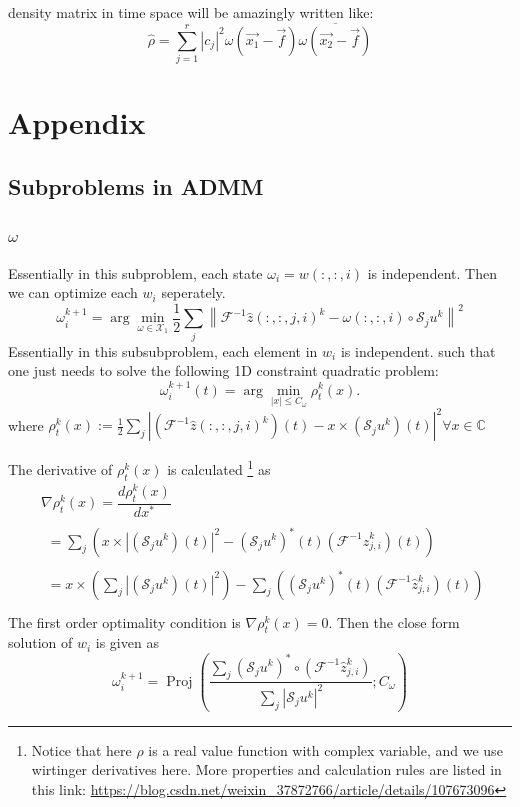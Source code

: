\documentclass{article}
\numberwithin{equation}{section}
\begin{document}
density matrix in time space will be amazingly written like:
$$
\hat{\rho} = \sum_{j=1}^{r}\left|c_{j}\right|^{2} \omega(\overrightarrow{x_1} - \overrightarrow{f}) \overline { \omega(\overrightarrow{x_2} - \overrightarrow{f})}
$$ 
 
 
  \section{Appendix}
\subsection{Subproblems in ADMM}
\label{section:subproblems}
\subsubsection{$\omega$}
Essentially in this subproblem, each state $\omega_i=w(:,:,i)$ is independent. Then we can optimize each $w_i$ seperately.
 $$
 \omega_i^{k+1}=\arg \min _{\omega \in \mathcal{X}_{1}} \frac{1}{2} \sum_{j}\left\|\mathcal{F}^{-1} \hat{z}(:,:,j,i)^{k}-\omega(:,:,i) \circ \mathcal{S}_{j} u^{k}\right\|^{2}
 $$ 
 Essentially in this subsubproblem, each element in $w_i$ is independent.
 such that one just needs to solve the following 1D constraint quadratic problem:
$$
\omega_i^{k+1}(t)=\arg \min _{|x| \leq C_{\omega}} \rho_{t}^{k}(x).
$$
where
$\rho_{t}^{k}(x):=\frac{1}{2} \sum_{j}\left|\left(\mathcal{F}^{-1} \hat{z}(:,:,j,i)^{k}\right)(t)-x \times\left(\mathcal{S}_{j} u^{k}\right)(t)\right|^{2} \forall x \in \mathbb{C}$ 

The derivative of $\rho_{t}^{k}(x)$ is calculated 
\footnote{Notice that here $\rho$ is a real value function with complex variable, and we use wirtinger derivatives here. More properties and calculation rules are listed in this link: \url{https://blog.csdn.net/weixin_37872766/article/details/107673096}} as
$$
\begin{aligned}
&\nabla \rho_{t}^{k}(x) = \dfrac{ d\rho_{t}^{k}(x)}{dx^*} \\
&\begin{aligned}
=\sum_{j}\left(x \times\left|\left(\mathcal{S}_{j} u^{k}\right)(t)\right|^{2}-\left(\mathcal{S}_{j} u^{k}\right)^{*}(t)\left(\mathcal{F}^{-1} \hat{z}_{j,i}^{k}\right)(t)\right)
\end{aligned} \\
&\begin{aligned}
=x \times\left(\sum_{j}\left|\left(\mathcal{S}_{j} u^{k}\right)(t)\right|^{2}\right)-\sum_{j}\left(\left(\mathcal{S}_{j} u^{k}\right)^{*}(t)\left(\mathcal{F}^{-1} \hat{z}_{j,i}^{k}\right)(t)\right) \\
\end{aligned}
\end{aligned}
$$
The first order optimality condition is $\nabla \rho_{t}^{k}(x)=0 $. Then the close form solution of $w_i$ is given as
$$
\omega_i^{k+1}=\operatorname{Proj}\left(\frac{ \sum_{j}\left(\mathcal{S}_{j} u^{k}\right)^{*} \circ\left(\mathcal{F}^{-1} \hat{z}_{j,i}^{k}\right)}{ \sum_{j}\left|\mathcal{S}_{j} u^{k}\right|^{2}} ; C_{\omega}\right)
$$
\end{document}
